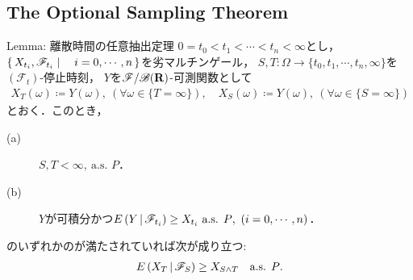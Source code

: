 \subsection{The Optional Sampling Theorem}
	\begin{itembox}[l]{Lemma: 離散時間の任意抽出定理}\label{lem:optional_sampling_theorem}
		$0 = t_0 < t_1 < \cdots < t_n < \infty$とし，
		$\left\{\, X_{t_i},\mathscr{F}_{t_i} \mid \quad i=0,\cdots,n\, \right\}$を劣マルチンゲール，
		$S,T:\Omega \longrightarrow \{t_0,t_1,\cdots,t_n,\infty\}$を$(\mathscr{F}_t)$-停止時刻\footnotemark，
		$Y$を$\mathscr{F}/\mathscr{B}(\mathbf{R})$-可測関数として
		\begin{align}
			X_T(\omega) \coloneqq Y(\omega),\ (\forall \omega \in \{T=\infty\}), \quad
			X_S(\omega) \coloneqq Y(\omega),\ (\forall \omega \in \{S=\infty\})
		\end{align}
		とおく．このとき，
		\begin{description}
			\item[(a)] $S,T < \infty,\ \mbox{a.s. $P$}$．
			\item[(b)] $Y$が可積分かつ$\cexp{Y}{\mathscr{F}_{t_i}} \geq X_{t_i}\ \mbox{a.s. $P$},\ (i=0,\cdots,n)$．
		\end{description}
		のいずれかのが満たされていれば次が成り立つ:
		\begin{align}
			E\left( X_T \, \middle|\, \mathscr{F}_S \right) \geq X_{S \wedge T}
			\quad \mbox{a.s. $P$}.
			\label{eq:lem_optional_sampling_theorem_1}
		\end{align}
	\end{itembox}
